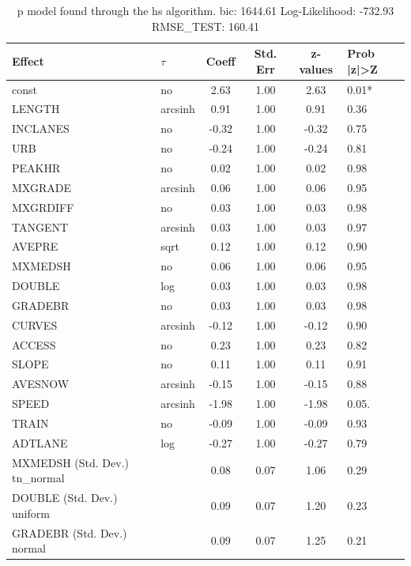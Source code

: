 \begin{table}
	\caption{p model found through the hs algorithm. bic: 1644.61 Log-Likelihood: -732.93 RMSE_TEST: 160.41}
	\begin{center}
		\begin{tabular}{|l|l|c|c|c|l|}
			\hline
			Effect & $\tau$ & Coeff & Std. Err & z-values & Prob |z|>Z \\
			\hline
			const & no & 2.63 & 1.00 & 2.63 & 0.01* \\
			\hline
			LENGTH & arcsinh & 0.91 & 1.00 & 0.91 & 0.36 \\
			\hline
			INCLANES & no & -0.32 & 1.00 & -0.32 & 0.75 \\
			\hline
			URB & no & -0.24 & 1.00 & -0.24 & 0.81 \\
			\hline
			PEAKHR & no & 0.02 & 1.00 & 0.02 & 0.98 \\
			\hline
			MXGRADE & arcsinh & 0.06 & 1.00 & 0.06 & 0.95 \\
			\hline
			MXGRDIFF & no & 0.03 & 1.00 & 0.03 & 0.98 \\
			\hline
			TANGENT & arcsinh & 0.03 & 1.00 & 0.03 & 0.97 \\
			\hline
			AVEPRE & sqrt & 0.12 & 1.00 & 0.12 & 0.90 \\
			\hline
			MXMEDSH & no & 0.06 & 1.00 & 0.06 & 0.95 \\
			\hline
			DOUBLE & log & 0.03 & 1.00 & 0.03 & 0.98 \\
			\hline
			GRADEBR & no & 0.03 & 1.00 & 0.03 & 0.98 \\
			\hline
			CURVES & arcsinh & -0.12 & 1.00 & -0.12 & 0.90 \\
			\hline
			ACCESS & no & 0.23 & 1.00 & 0.23 & 0.82 \\
			\hline
			SLOPE & no & 0.11 & 1.00 & 0.11 & 0.91 \\
			\hline
			AVESNOW & arcsinh & -0.15 & 1.00 & -0.15 & 0.88 \\
			\hline
			SPEED & arcsinh & -1.98 & 1.00 & -1.98 & 0.05. \\
			\hline
			TRAIN & no & -0.09 & 1.00 & -0.09 & 0.93 \\
			\hline
			ADTLANE & log & -0.27 & 1.00 & -0.27 & 0.79 \\
			\hline
			MXMEDSH (Std. Dev.) tn_normal &  & 0.08 & 0.07 & 1.06 & 0.29 \\
			\hline
			DOUBLE (Std. Dev.) uniform &  & 0.09 & 0.07 & 1.20 & 0.23 \\
			\hline
			GRADEBR (Std. Dev.) normal &  & 0.09 & 0.07 & 1.25 & 0.21 \\

\end{tabular}
\end{center}
\end{table}
